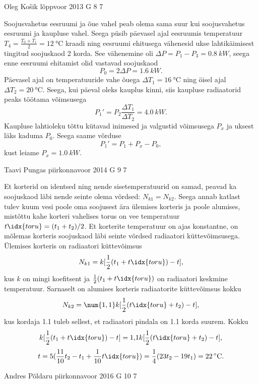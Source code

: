 \documentclass[11pt, twoside]{article}
\begin{document}
{%
{Oleg Košik} %
{lõppvoor} %
{2013} %
{G 8} %
{7} %
{

\ifSolution
Soojusvahetus eesruumi ja õue vahel peab olema sama suur kui soojusvahetus eesruumi ja kaupluse vahel. Seega püsib päevasel ajal eesruumis temperatuur $T_4=\frac{T_0+T_1}{2}=\SI{12}{\celsius}$ kraadi ning eesruumi ehitusega vähenesid ukse lahtikäimisest tingitud soojuskaod 2 korda. See vähenemine oli $\Delta P=P_1-P_3=\SI{0,8}{kW}$, seega enne eesruumi ehitamist olid vastavad soojuskaod
\[
P_0=2\Delta P=\SI{1,6}{kW}.
\]
Päevasel ajal on temperatuuride vahe õuega $\Delta T_1=\SI{16}{\celsius}$ ning öisel ajal $\Delta T_2=\SI{20}{\celsius}$. Seega, kui päeval oleks kauplus kinni, siis kaupluse radiaatorid peaks töötama võimsusega
\[
P_1'=P_2\frac{\Delta T_1}{\Delta T_2}=\SI{4,0}{kW}.
\]
Kaupluse lahtioleku tõttu kütavad inimesed ja valgustid võimsusega $P_x$ ja uksest läks kaduma $P_0$. Seega saame võrduse
\[
P_1'=P_1+P_x-P_0,
\]
kust leiame $P_x=\SI{1,0}{kW}$.
\fi
}

{Taavi Pungas} %
{piirkonnavoor} %
{2014} %
{G 9} %
{7} %
{

\ifSolution
Et korterid on identsed ning nende sisetemperatuurid on samad, peavad ka soojuskaod läbi nende seinte olema võrdsed: $N_{k1}=N_{k2}$. Seega annab katlast tulev kuum vesi poole oma soojusest ära ülemises korteris ja poole alumises, mistõttu kahe korteri vahelises torus on vee temperatuur $t\idx{toru}=(t_1+t_2)/2$. Et korterite temperatuur on ajas konstantne, on mõlemas korteris soojuskaod läbi seinte võrdsed radiaatori küttevõimsusega. Ülemises korteris on radiaatori küttevõimsus
\[
N_{k1}=k[\frac{1}{2}(t_1+t\idx{toru})-t],
\]
kus $k$ on mingi koefitsent ja $\frac{1}{2}(t_1+t\idx{toru})$ on radiaatori keskmine temperatuur. Sarnaselt on alumises korteris radiaatorite küttevõimsus kokku
\[
N_{k2}=\num{1,1} k[\frac{1}{2}(t\idx{toru}+t_{2})-t],
\]
kus kordaja \num{1,1} tuleb sellest, et radiaatori pindala on \num{1,1} korda suurem. Kokku
\[ k[\frac{1}{2}(t_1+t\idx{toru})-t]=\text{1,1}k[\frac{1}{2}(t\idx{toru}+t_{2})-t], \]
\[ t=5 (\frac{11}{10}t_2-t_1+\frac{1}{10}t\idx{toru})=\frac{1}{4}(23t_2-19t_1)=22\,^{\circ}\mathrm{C}. \]
\fi
}

{Andres Põldaru} %
{piirkonnavoor} %
{2016} %
{G 10} %
{7} %
{

}}
\end{document}
